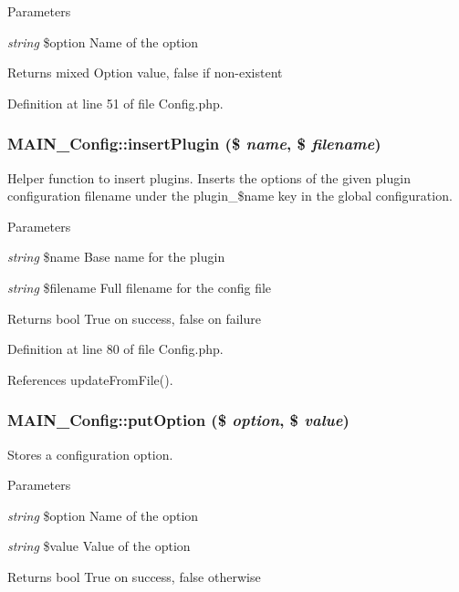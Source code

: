 \begin{DoxyParams}{Parameters}
\item[{\em string}]\$option Name of the option\end{DoxyParams}
\begin{DoxyReturn}{Returns}
mixed Option value, false if non-\/existent 
\end{DoxyReturn}


Definition at line 51 of file Config.php.\hypertarget{classMAIN__Config_abc9328fbcaa9bdad08924c639722dac1}{
\subsubsection[{insertPlugin}]{\setlength{\rightskip}{0pt plus 5cm}MAIN\_\-Config::insertPlugin (\$ {\em name}, \/  \$ {\em filename})}}
\label{dc/d96/classMAIN__Config_abc9328fbcaa9bdad08924c639722dac1}
Helper function to insert plugins. Inserts the options of the given plugin configuration filename under the plugin\_\-\$name key in the global configuration.


\begin{DoxyParams}{Parameters}
\item[{\em string}]\$name Base name for the plugin \item[{\em string}]\$filename Full filename for the config file\end{DoxyParams}
\begin{DoxyReturn}{Returns}
bool True on success, false on failure 
\end{DoxyReturn}


Definition at line 80 of file Config.php.

References updateFromFile().\hypertarget{classMAIN__Config_a8de584a5144c39504341867b7aabcd78}{
\subsubsection[{putOption}]{\setlength{\rightskip}{0pt plus 5cm}MAIN\_\-Config::putOption (\$ {\em option}, \/  \$ {\em value})}}
\label{dc/d96/classMAIN__Config_a8de584a5144c39504341867b7aabcd78}
Stores a configuration option.


\begin{DoxyParams}{Parameters}
\item[{\em string}]\$option Name of the option \item[{\em string}]\$value Value of the option\end{DoxyParams}
\begin{DoxyReturn}{Returns}
bool True on success, false otherwise 
\end{DoxyReturn}


